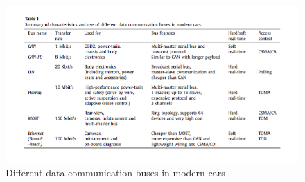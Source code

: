 \documentclass[11pt]{article}
\begin{document}
\begin{figure}[h]
	\caption{Different data communication buses in modern cars \cite{crispo}}
	\label{fig:buses}
	\centering
	\includegraphics[width=\textwidth]{buses}
\end{figure}
\end{document}

